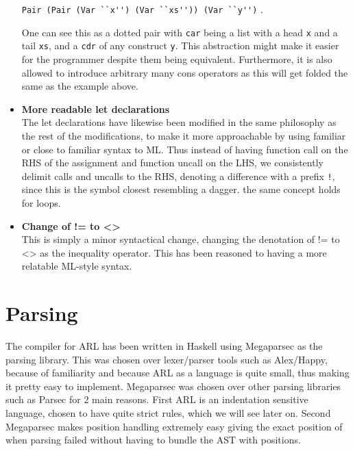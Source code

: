 \documentclass[a4paper]{article}
\begin{document}
\begin{itemize}
\verb+Pair (Pair (Var ``x'') (Var ``xs'')) (Var ``y'')+ .

One can see this as a dotted pair with \texttt{car} being a list with a head \texttt{x} and a tail \texttt{xs}, and a \texttt{cdr} of any construct \texttt{y}. This abstraction might make it easier for the programmer despite them being equivalent. Furthermore, it is also allowed to introduce arbitrary many cons operators as this will get folded the same as the example above.
\item \textbf{More readable let declarations}\\
The let declarations have likewise been modified in the same philosophy as the rest of the modifications, to make it more approachable by using familiar or close to familiar syntax to ML. Thus instead of having function call on the RHS of the assignment and function uncall on the LHS, we consistently delimit calls and uncalls to the RHS, denoting a difference with a prefix \texttt{!}, since this is the symbol closest resembling a dagger. the same concept holds for loops.
\item \textbf{Change of != to <>}\\
This is simply a minor syntactical change, changing the denotation of != to <> as the inequality operator. This has been reasoned to having a more relatable ML-style syntax.
\end{itemize}

\section{Parsing}
\label{parsing}
The compiler for ARL has been written in Haskell using Megaparsec as the parsing library. This was chosen over lexer/parser tools such as Alex/Happy, because of familiarity and because ARL as a language is quite small, thus making it pretty easy to implement. Megaparsec was chosen over other parsing libraries such as Parsec for 2 main reasons. First ARL is an indentation sensitive language, chosen to have quite strict rules, which we will see later on. Second Megaparsec makes position handling extremely easy giving the exact position of when parsing failed without having to bundle the AST with positions.
\end{document}
